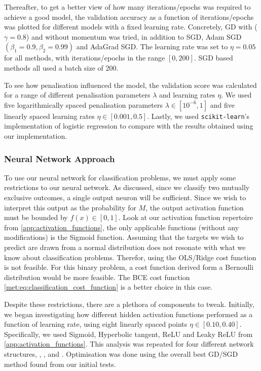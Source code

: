     Thereafter, to get a better view of how many iterations/epochs was required to achieve a good model, the validation accuracy as a function of iterations/epochs was plotted for different models with a fixed learning rate. Concretely, GD with ($\gamma = 0.8$) and without momentum was tried, in addition to SGD, Adam SGD $(\beta_1 = 0.9, \beta_2 = 0.99)$ and AdaGrad SGD. The learning rate was set to $\eta = 0.05$ for all methods, with iterations/epochs in the range $[0,200]$. SGD based methods all used a batch size of 200. 

    To see how penalisation influenced the model, the validation score was calculated for a range of different penalisation parameters $\lambda$ and learning rates $\eta$. We used five logarithmically spaced penalisation parameters $\lambda \in [10^{-6}, 1]$ and five linearly spaced learning rates $\eta \in [0.001, 0.5]$. Lastly, we used \verb|scikit-learn|'s implementation of logistic regression to compare with the results obtained using our implementation.

    \subsubsection{Neural Network Approach}
    To use our neural network for classification problems, we must apply some restrictions to our neural network. As discussed, since we classify two mutually exclusive outcomes, a single output neuron will be sufficient. Since we wish to interpret this output as the probability for $M$, the output activation function must be bounded by $f(x) \in [0,1]$. Look at our activation function repertoire from \cref{app:activation_functions}, the only applicable functions (without any modifications) is the Sigmoid function. Assuming that the targets we wish to predict are drawn from a normal distribution does not resonate with what we know about classification problems. Therefor, using the OLS/Ridge cost function is not feasible. For this binary problem, a cost function derived form a Bernoulli distribution would be more feasible. The BCE cost function \cref{met:eq:classification_cost_function} is a better choice in this case.     
    
    Despite these restrictions, there are a plethora of components to tweak. Initially, we began investigating how different hidden activation functions performed as a function of learning rate, using eight linearly spaced points $\eta \in [0.10, 0.40]$. Specifically, we used Sigmoid, Hyperbolic tangent, ReLU and Leaky ReLU from \cref{app:activation_functions}. This analysis was repeated for four different network structures, , ,  and . Optimisation was done using the overall best GD/SGD method found from our initial tests.  

